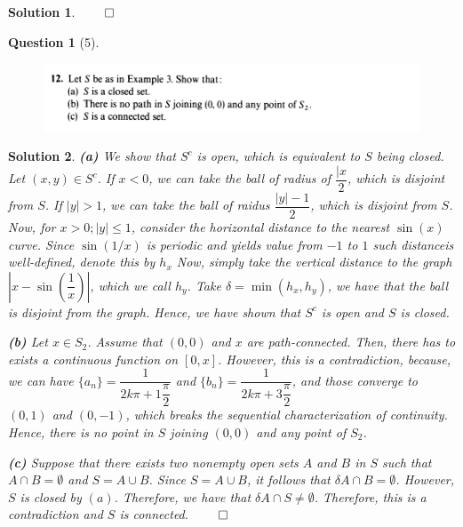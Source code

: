 \documentclass{article} %
\theoremstyle{quest}
\newtheorem*{question}{Question}
\newtheorem*{solution}{Solution}
\begin{document}
\begin{solution}
\hfill $\qed$
 
\end{solution}

\newpage

\begin{question}[5]
\hfill
\begin{figure}[h!]
  \centering
    \includegraphics[width=1\textwidth]{MA-2-27-12.png}
\end{figure}
\end{question}
\begin{solution} 
\textbf{(a)} 
We show that $S^c$ is open, which is equivalent to $S$ being closed. Let $(x,y) \in S^c$. If 
$x < 0$, we can take the ball of radius of $\dfrac{|x}{2}$, which is disjoint from $S$. 
If $|y| > 1$, we can take the ball of raidus $\dfrac{|y|-1}{2}$, which is disjoint from $S$. 
Now, for $x > 0; |y| \leq 1$, consider the horizontal distance to the nearest $\sin(x)$ curve.
Since $\sin(1/x)$ is periodic and yields value from $-1$ to $1$ such distanceis well-defined,
denote this by $h_x$  
Now, simply take the vertical distance to the graph $|x - \sin(\dfrac{1}{x})|$, which we call $h_y$.
Take $\delta = \min(h_x, h_y)$, we have that the ball is disjoint from the graph. Hence,
we have shown that $S^c$ is open and $S$ is closed.

\bigskip

\textbf{(b)}
Let $x \in S_2$.
Assume that $(0,0)$ and $x$ are path-connected. Then, there has to exists a continuous function
on $[0,x]$. However, this is a contradiction, because, we can have 
$\{a_n \} = \dfrac{1}{2k\pi 
+ 1\dfrac{\pi}{2}}$ 
and 
$\{b_n \} = \dfrac{1}{2k\pi 
+ 3\dfrac{\pi}{2}}$, and those converge to $(0,1)$ and $(0,-1)$, which breaks the sequential 
characterization of continuity. Hence, there is no point in $S$ joining $(0,0)$ and any point
of $S_2$. 

\bigskip

\textbf{(c)}
Suppose that there exists two nonempty open sets $A$ and $B$ in $S$ such that $A \cap B = \emptyset$
and $S = A \cup B$. Since $S = A \cup B$, it follows that $\delta A \cap B = \emptyset$.
However, $S$ is closed by $(a)$. Therefore, we have that $\delta A \cap S \neq \emptyset$. Therefore,
this is a contradiction and $S$ is connected.  
\hfill $\qed$
 
\end{solution}
\end{document}
